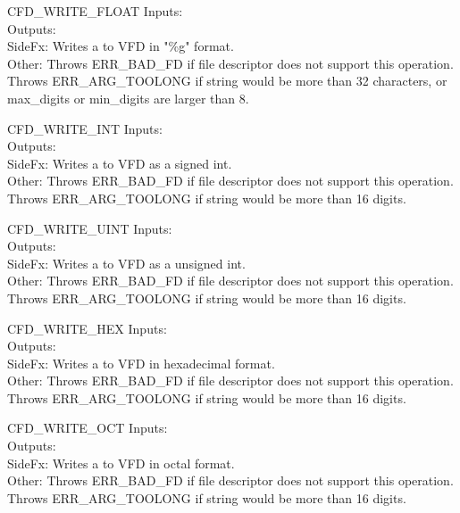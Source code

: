 \begin{sccall}{CFD\_WRITE\_FLOAT}
Inputs: \\
Outputs: \scargs{}\\
SideFx: Writes a to VFD in "\%g" format.\\
Other: Throws ERR\_BAD\_FD if file descriptor does not support this operation.\\
Throws ERR\_ARG\_TOOLONG if string would be more than 32 characters, or max\_digits or min\_digits are larger than 8.
\end{sccall}
\begin{sccall}{CFD\_WRITE\_INT}
Inputs: \\
Outputs: \scargs{}\\
SideFx: Writes a to VFD as a signed int.\\
Other: Throws ERR\_BAD\_FD if file descriptor does not support this operation.\\
Throws ERR\_ARG\_TOOLONG if string would be more than 16 digits.
\end{sccall}
\begin{sccall}{CFD\_WRITE\_UINT}
Inputs: \\
Outputs: \scargs{}\\
SideFx: Writes a to VFD as a unsigned int.\\
Other: Throws ERR\_BAD\_FD if file descriptor does not support this operation.\\
Throws ERR\_ARG\_TOOLONG if string would be more than 16 digits.
\end{sccall}
\begin{sccall}{CFD\_WRITE\_HEX}
Inputs: \\
Outputs: \scargs{}\\
SideFx: Writes a to VFD in hexadecimal format.\\
Other: Throws ERR\_BAD\_FD if file descriptor does not support this operation.\\
Throws ERR\_ARG\_TOOLONG if string would be more than 16 digits.
\end{sccall}
\begin{sccall}{CFD\_WRITE\_OCT}
Inputs: \\
Outputs: \scargs{}\\
SideFx: Writes a to VFD in octal format.\\
Other: Throws ERR\_BAD\_FD if file descriptor does not support this operation.\\
Throws ERR\_ARG\_TOOLONG if string would be more than 16 digits.
\end{sccall}

